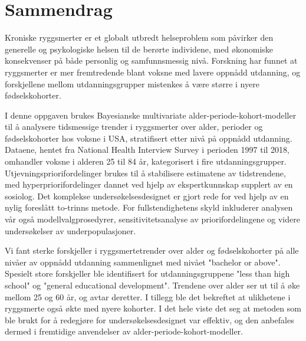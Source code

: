 \section*{Sammendrag}
Kroniske ryggsmerter er et globalt utbredt helseproblem som påvirker den generelle og psykologiske helsen til de berørte individene, med økonomiske konsekvenser på både personlig og samfunnsmessig nivå. Forskning har funnet at ryggsmerter er mer fremtredende blant voksne med lavere oppnådd utdanning, og forskjellene mellom utdanningsgrupper mistenkes å være større i nyere fødselskohorter.

I denne oppgaven brukes Bayesianske multivariate alder-periode-kohort-modeller til å analysere tidsmessige trender i ryggsmerter over alder, perioder og fødselskohorter hos voksne i USA, stratifisert etter nivå på oppnådd utdanning. Dataene, hentet fra National Health Interview Survey i perioden 1997 til 2018, omhandler voksne i alderen 25 til 84 år, kategorisert i fire utdanningsgrupper. Utjevningspriorifordelinger brukes til å stabilisere estimatene av tidstrendene, med hyperpriorifordelinger dannet ved hjelp av ekspertkunnskap supplert av en sosiolog. Det komplekse undersøkelsesdesignet er gjort rede for ved hjelp av en nylig foreslått to-trinns metode. For fullstendighetens skyld inkluderer analysen vår også modellvalgprosedyrer, sensitivitetsanalyse av priorifordelingene og videre undersøkelser av underpopulasjoner.

Vi fant sterke forskjeller i ryggsmertetrender over alder og fødselskohorter på alle nivåer av oppnådd utdanning sammenlignet med nivået "bachelor or above". Spesielt store forskjeller ble identifisert for utdanningsgruppene "less than high school" og "general educational development". Trendene over alder ser ut til å øke mellom 25 og 60 år, og avtar deretter. I tillegg ble det bekreftet at ulikhetene i ryggsmerte også økte med nyere kohorter. I det hele viste det seg at metoden som ble brukt for å redegjøre for undersøkelsesdesignet var effektiv, og den anbefales dermed i fremtidige anvendelser av alder-periode-kohort-modeller.
